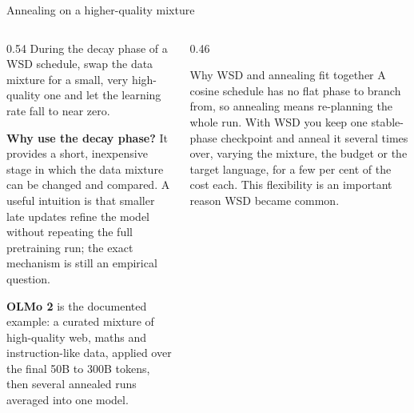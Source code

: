 \documentclass[aspectratio=169,10pt]{beamer}
\begin{document}
\begin{frame}[shrink=8]{Annealing on a higher-quality mixture}
  \begin{columns}[T]
    \begin{column}{0.54\textwidth}
      During the decay phase of a WSD schedule, swap the data mixture for a
      small, very high-quality one and let the learning rate fall to near zero.
      \vspace{0.5em}

      \textbf{Why use the decay phase?} It provides a short, inexpensive stage
      in which the data mixture can be changed and compared. A useful intuition
      is that smaller late updates refine the model without repeating the full
      pretraining run; the exact mechanism is still an empirical question.
      \vspace{0.5em}

      \textbf{OLMo 2} is the documented example: a curated mixture of
      high-quality web, maths and instruction-like data, applied over the final
      50B to 300B tokens, then several annealed runs averaged into one model.
    \end{column}
    \begin{column}{0.46\textwidth}
      \begin{block}{Why WSD and annealing fit together}
        \small
        A cosine schedule has no flat phase to branch from, so annealing means
        re-planning the whole run.
        \vspace{0.4em}
        With WSD you keep one stable-phase checkpoint and anneal it several
        times over, varying the mixture, the budget or the target language, for
        a few per cent of the cost each.
        \vspace{0.4em}
        This flexibility is an important reason WSD became common.
      \end{block}
    \end{column}
  \end{columns}
\end{frame}
\end{document}
